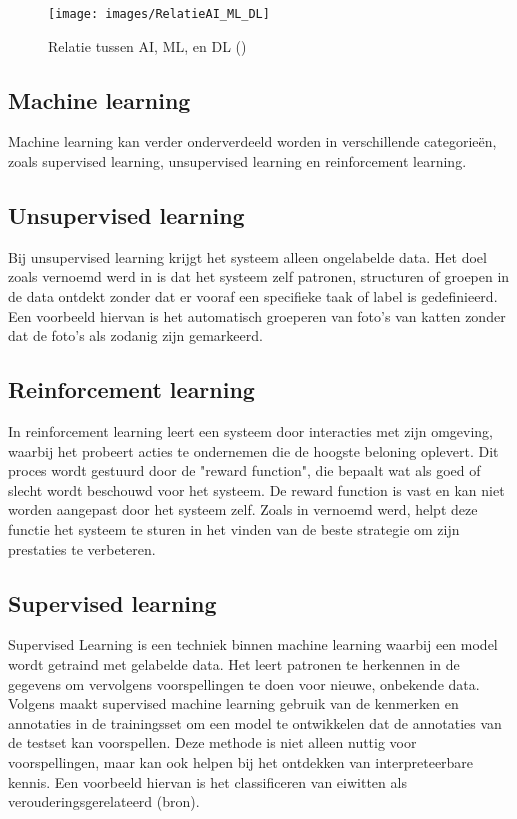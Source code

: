 \begin{figure}[H]
    \centering
    \texttt{[image: images/RelatieAI\_ML\_DL]}
    \caption{Relatie tussen AI, ML, en DL  (\cite{Kelleher2019})}
    \label{fig:relatieaimldl}
\end{figure}

\subsection{Machine learning}

Machine learning kan verder onderverdeeld worden in verschillende categorieën, zoals supervised learning, unsupervised learning en reinforcement learning.

\subsection*{Unsupervised learning}

Bij unsupervised learning krijgt het systeem alleen ongelabelde data. Het doel zoals vernoemd werd in \textcite{Naeem2023} is dat het systeem zelf patronen, structuren of groepen in de data ontdekt zonder dat er vooraf een specifieke taak of label is gedefinieerd. Een voorbeeld hiervan is het automatisch groeperen van foto’s van katten zonder dat de foto’s als zodanig zijn gemarkeerd.

\subsection*{Reinforcement learning}

In reinforcement learning leert een systeem door interacties met zijn omgeving, waarbij het probeert acties te ondernemen die de hoogste beloning oplevert. Dit proces wordt gestuurd door de "reward function", die bepaalt wat als goed of slecht wordt beschouwd voor het systeem. De reward function is vast en kan niet worden aangepast door het systeem zelf. Zoals in \textcite{Gallistel1999} vernoemd werd, helpt deze functie het systeem te sturen in het vinden van de beste strategie om zijn prestaties te verbeteren.


\vspace{20 mm}

\subsection*{Supervised learning}

Supervised Learning is een techniek binnen machine learning waarbij een model wordt getraind met gelabelde data. Het leert patronen te herkennen in de gegevens om vervolgens voorspellingen te doen voor nieuwe, onbekende data. Volgens \textcite{Fabris2017} maakt supervised machine learning gebruik van de kenmerken en annotaties in de trainingsset om een model te ontwikkelen dat de annotaties van de testset kan voorspellen. Deze methode is niet alleen nuttig voor voorspellingen, maar kan ook helpen bij het ontdekken van interpreteerbare kennis. Een voorbeeld hiervan is het classificeren van eiwitten als verouderingsgerelateerd (bron).

